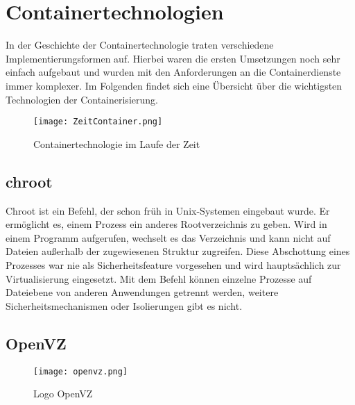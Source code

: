 \section{Containertechnologien} 
\label{sec:Containertechnologien}

In der Geschichte der Containertechnologie traten verschiedene Implementierungsformen auf.
Hierbei waren die ersten Umsetzungen noch sehr einfach aufgebaut und wurden mit den Anforderungen an die Containerdienste immer komplexer.
Im Folgenden findet sich eine Übersicht über die wichtigsten Technologien der Containerisierung.

\begin{figure}[H]
	\begin{center}
		\texttt{[image: ZeitContainer.png]}
	\end{center}
	\caption[Containertechnologie im Laufe der Zeit]{Containertechnologie im Laufe der Zeit}
	\label{fig:CTZeit}
\end{figure}


\subsection*{chroot}
\label{sec:chroot}

Chroot ist ein Befehl, der schon früh in Unix-Systemen eingebaut wurde.
Er ermöglicht es, einem Prozess ein anderes Rootverzeichnis zu geben.
Wird in einem Programm  aufgerufen, wechselt es das Verzeichnis und kann nicht auf Dateien außerhalb der zugewiesenen Struktur zugreifen.
Diese Abschottung eines Prozesses war nie als Sicherheitsfeature vorgesehen und wird hauptsächlich zur Virtualisierung eingesetzt.
Mit dem Befehl können einzelne Prozesse auf Dateiebene von anderen Anwendungen getrennt werden, weitere Sicherheitsmechanismen oder Isolierungen gibt es nicht.\cite{IEEE7830207,569694, MANPAGE01}
\newpage
\subsection*{OpenVZ}
\label{sec:OpenVZ}

\begin{wrapfigure}{l}{0.4\textwidth}
	\vspace{-40pt}
	\begin{center}
		\texttt{[image: openvz.png]}
	\end{center}
	\vspace{-15pt}
	\caption[Logo OpenVZ]{Logo OpenVZ \footnotemark}
	\label{fig:openvz}
	\vspace{-30pt}
\end{wrapfigure}

